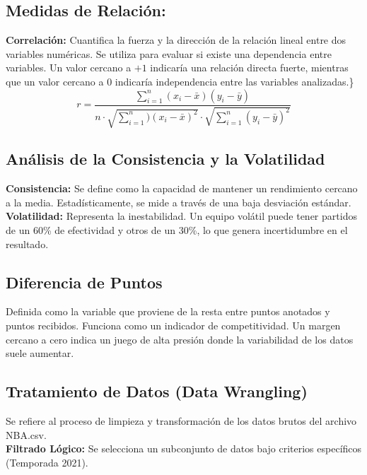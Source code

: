 \documentclass[oneside,11pt]{Latex/Classes/PhDthesisPSnPDF}
\begin{document}
\subsection{Medidas de Relación:}

\textbf{Correlación:} Cuantifica la fuerza y la dirección de la relación
lineal entre dos variables numéricas. Se utiliza para evaluar si existe
una dependencia entre variables. Un valor cercano a \(+1\) indicaría una
relación directa fuerte, mientras que un valor cercano a \(0\) indicaría
independencia entre las variables analizadas.\}
\[r = \frac{\sum_{i=1}^{n} (x_i - \bar{x})(y_i - \bar{y})}{n\cdot\sqrt{\sum_{i=1}^{n}) (x_i - \bar{x})^2} \cdot \sqrt{\sum_{i=1}^{n} (y_i - \bar{y})^2}}\]

\subsection{Análisis de la Consistencia y la Volatilidad}

\textbf{Consistencia:} Se define como la capacidad de mantener un
rendimiento cercano a la media. Estadísticamente, se mide a través de
una baja desviación estándar.\\

\textbf{Volatilidad:} Representa la inestabilidad. Un equipo volátil
puede tener partidos de un 60\% de efectividad y otros de un 30\%, lo
que genera incertidumbre en el resultado.\\

\subsection{Diferencia de Puntos}

Definida como la variable que proviene de la resta entre puntos anotados
y puntos recibidos. Funciona como un indicador de competitividad. Un
margen cercano a cero indica un juego de alta presión donde la
variabilidad de los datos suele aumentar.\\

\subsection{Tratamiento de Datos (Data Wrangling)}

Se refiere al proceso de limpieza y transformación de los datos brutos
del archivo NBA.csv.\\

\textbf{Filtrado Lógico:} Se selecciona un subconjunto de datos bajo
criterios específicos (Temporada 2021).\\
\end{document}
